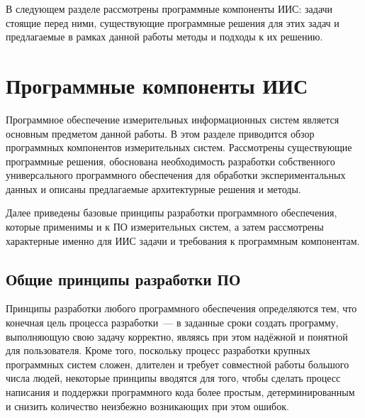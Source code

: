\documentclass[a4paper, 14pt, titlepage]{extarticle}
\let\oldsection\section
\renewcommand{\section}{\newpage\oldsection}
\begin{document}
  В следующем разделе рассмотрены программные компоненты ИИС: задачи стоящие перед ними, существующие
  программные решения для этих задач и предлагаемые в рамках данной работы методы и подходы к их решению.

  \section{Программные компоненты ИИС}\label{sec:software}

  Программное обеспечение измерительных информационных систем является основным предметом данной
  работы. В этом разделе приводится обзор программных компонентов измерительных систем.
  Рассмотрены существующие программные решения, обоснована необходимость разработки собственного
  универсального программного обеспечения для обработки экспериментальных данных и описаны
  предлагаемые архитектурные решения и методы.

  Далее приведены базовые принципы разработки программного обеспечения, которые применимы и к ПО
  измерительных систем, а затем рассмотрены характерные именно для ИИС задачи и требования к
  программным компонентам.


  \subsection{Общие принципы разработки ПО}\label{ssec:software-principles}


  Принципы разработки любого программного обеспечения определяются тем, что конечная цель
  процесса разработки~--- в заданные сроки создать
  программу, выполняющую свою задачу корректно, являясь при этом надёжной и понятной для
  пользователя. Кроме того, поскольку процесс разработки крупных программных систем сложен, длителен и
  требует совместной работы большого числа людей, некоторые принципы вводятся для того, чтобы
  сделать процесс написания и поддержки программного кода более простым, детерминированным и
  снизить количество неизбежно возникающих при этом ошибок.
\end{document}
